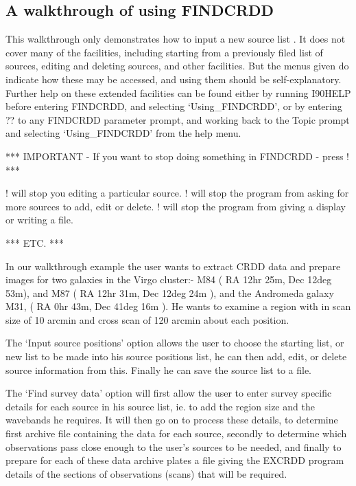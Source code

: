 \documentclass[twoside,11pt]{starlink}
\begin{document}
\subsection{A walkthrough of using FINDCRDD}
This walkthrough only demonstrates how to input a new source list . It does
not cover many of the facilities, including starting from a previously filed
list of sources, editing and deleting sources, and other facilities. But
the menus given do indicate how these may be accessed, and using them should
be self-explanatory. Further help on these extended facilities can be found
either by running I90HELP before entering FINDCRDD, and selecting
`Using\_FINDCRDD', or by entering ?? to any FINDCRDD parameter prompt, and
working back to the Topic prompt and selecting `Using\_FINDCRDD' from the
help menu.
\begin{terminalv}

*** IMPORTANT - If you want to stop doing something in FINDCRDD - press ! ***

! will stop you editing a particular source.
! will stop the program from asking for more sources to add, edit or delete.
! will stop the program from giving a display or writing a file.

***  ETC.  ***
\end{terminalv}
In our walkthrough example the user wants to extract CRDD data and prepare
images for two galaxies in the Virgo cluster:- M84 ( RA 12hr 25m,
Dec 12deg 53m), and M87 ( RA 12hr 31m, Dec 12deg 24m ), and the Andromeda
galaxy M31, ( RA 0hr 43m, Dec 41deg 16m ). He wants to examine a region with
in scan size of 10 arcmin and cross scan of 120 arcmin about each position.


The `Input source positions' option allows the user to choose the starting
list, or new list to be made into his source positions list, he can then
add, edit, or delete source information from this. Finally he can save the
source list to a file.

The `Find survey data' option will first allow the user to enter survey
specific details for each source in his source list, ie. to add the region
size and the wavebands he requires. It will then go on to process these
details, to determine first archive file containing the data for each source,
secondly to determine which observations pass close enough to the user's
sources to be needed, and finally to prepare for each of these data
archive plates a file giving the EXCRDD program details of the sections of
observations (scans) that will be required.
\end{document}
